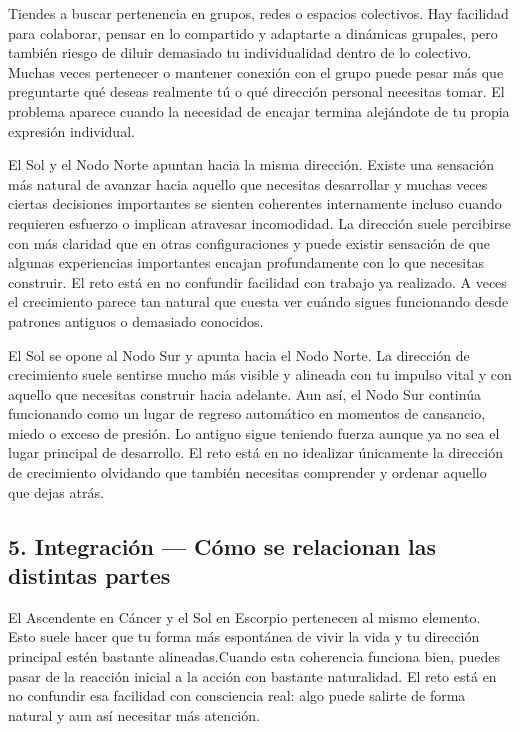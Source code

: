 \documentclass[11pt,a4paper]{article}
\begin{document}
Tiendes a buscar pertenencia en grupos, redes o espacios colectivos. Hay facilidad para colaborar, pensar en lo compartido y adaptarte a dinámicas grupales, pero también riesgo de diluir demasiado tu individualidad dentro de lo colectivo. Muchas veces pertenecer o mantener conexión con el grupo puede pesar más que preguntarte qué deseas realmente tú o qué dirección personal necesitas tomar. El problema aparece cuando la necesidad de encajar termina alejándote de tu propia expresión individual.

El Sol y el Nodo Norte apuntan hacia la misma dirección. Existe una sensación más natural de avanzar hacia aquello que necesitas desarrollar y muchas veces ciertas decisiones importantes se sienten coherentes internamente incluso cuando requieren esfuerzo o implican atravesar incomodidad. La dirección suele percibirse con más claridad que en otras configuraciones y puede existir sensación de que algunas experiencias importantes encajan profundamente con lo que necesitas construir. El reto está en no confundir facilidad con trabajo ya realizado. A veces el crecimiento parece tan natural que cuesta ver cuándo sigues funcionando desde patrones antiguos o demasiado conocidos.

El Sol se opone al Nodo Sur y apunta hacia el Nodo Norte. La dirección de crecimiento suele sentirse mucho más visible y alineada con tu impulso vital y con aquello que necesitas construir hacia adelante. Aun así, el Nodo Sur continúa funcionando como un lugar de regreso automático en momentos de cansancio, miedo o exceso de presión. Lo antiguo sigue teniendo fuerza aunque ya no sea el lugar principal de desarrollo. El reto está en no idealizar únicamente la dirección de crecimiento olvidando que también necesitas comprender y ordenar aquello que dejas atrás.

\vspace{0.5cm}


\subsection{5. Integración — Cómo se relacionan las distintas partes}

El Ascendente en Cáncer y el Sol en Escorpio pertenecen al mismo elemento. Esto suele hacer que tu forma más espontánea de vivir la vida y tu dirección principal estén bastante alineadas.Cuando esta coherencia funciona bien, puedes pasar de la reacción inicial a la acción con bastante naturalidad. El reto está en no confundir esa facilidad con consciencia real: algo puede salirte de forma natural y aun así necesitar más atención.
\end{document}
